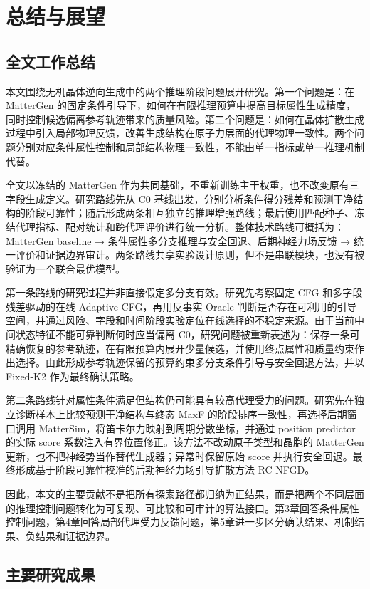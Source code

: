 \chapter{总结与展望}

\section{全文工作总结}

本文围绕无机晶体逆向生成中的两个推理阶段问题展开研究。第一个问题是：在 MatterGen 的固定条件引导下，如何在有限推理预算中提高目标属性生成精度，同时控制候选偏离参考轨迹带来的质量风险。第二个问题是：如何在晶体扩散生成过程中引入局部物理反馈，改善生成结构在原子力层面的代理物理一致性。两个问题分别对应条件属性控制和局部结构物理一致性，不能由单一指标或单一推理机制代替。

全文以冻结的 MatterGen 作为共同基础，不重新训练主干权重，也不改变原有三字段生成定义。研究路线先从 C0 基线出发，分别分析条件得分残差和预测干净结构的阶段可靠性；随后形成两条相互独立的推理增强路线；最后使用匹配种子、冻结代理指标、配对统计和跨代理评价进行统一分析。整体技术路线可概括为：MatterGen baseline → 条件属性多分支推理与安全回退、后期神经力场反馈 → 统一评价和证据边界审计。两条路线共享实验设计原则，但不是串联模块，也没有被验证为一个联合最优模型。

第一条路线的研究过程并非直接假定多分支有效。研究先考察固定 CFG 和多字段残差驱动的在线 Adaptive CFG，再用反事实 Oracle 判断是否存在可利用的引导空间，并通过风险、字段和时间阶段实验定位在线选择的不稳定来源。由于当前中间状态特征不能可靠判断何时应当偏离 C0，研究问题被重新表述为：保存一条可精确恢复的参考轨迹，在有限预算内展开少量候选，并使用终点属性和质量约束作出选择。由此形成参考轨迹保留的预算约束多分支条件引导与安全回退方法，并以 Fixed-K2 作为最终确认策略。

第二条路线针对属性条件满足但结构仍可能具有较高代理受力的问题。研究先在独立诊断样本上比较预测干净结构与终态 MaxF 的阶段排序一致性，再选择后期窗口调用 Matter\allowbreak Sim，将笛卡尔力映射到周期分数坐标，并通过 position predictor 的实际 score 系数注入有界位置修正。该方法不改动原子类型和晶胞的 MatterGen 更新，也不把神经势当作替代生成器；异常时保留原始 score 并执行安全回退。最终形成基于阶段可靠性校准的后期神经力场引导扩散方法 RC-NFGD。

因此，本文的主要贡献不是把所有探索路径都归纳为正结果，而是把两个不同层面的推理控制问题转化为可复现、可比较和可审计的算法接口。第3章回答条件属性控制问题，第4章回答局部代理受力反馈问题，第5章进一步区分确认结果、机制结果、负结果和证据边界。

\section{主要研究成果}

